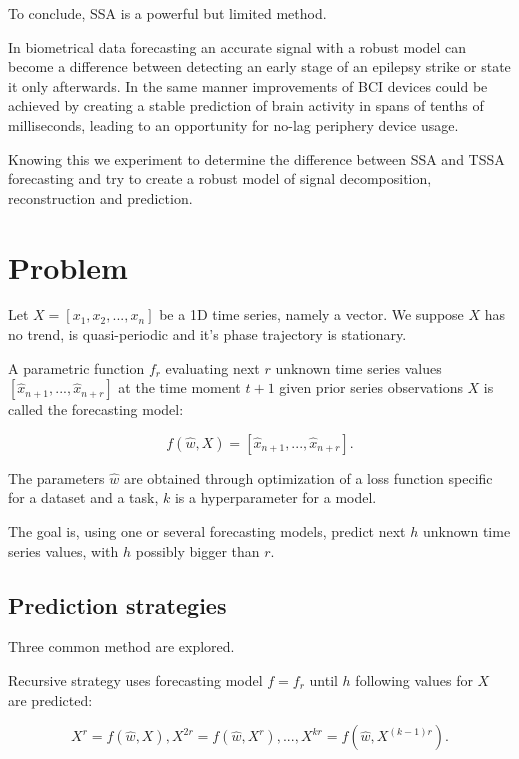 \documentclass{article}
\begin{document}
To conclude, SSA is a powerful but limited method.

In biometrical data forecasting an accurate signal with a robust model can become a difference between detecting an early stage of an epilepsy strike or state it only afterwards. In the same manner improvements of BCI devices could be achieved by creating a stable prediction of brain activity in spans of tenths of milliseconds, leading to an opportunity for no-lag periphery device usage. 

Knowing this we experiment to determine the difference between SSA and TSSA forecasting and try to create a robust model of signal decomposition, reconstruction and prediction.
\section{Problem}
\label{sec:Problem}

Let \(X = \left[x_1, x_2, ..., x_n\right]\) be a 1D time series, namely a vector. We suppose \(X\) has no trend, is quasi-periodic and it's phase trajectory is stationary.

A parametric function \(f_r\) evaluating next \(r\) unknown time series values \([\widehat{x}_{n+1}, ..., \widehat{x}_{n+r}]\) at the time moment \(t + 1\) given prior series observations \(X\) is called the forecasting model:

\begin{equation}
	f(\widehat{w}, X) = [\widehat{x}_{n+1}, ..., \widehat{x}_{n+r}].
\end{equation}

The parameters \(\widehat{w}\) are obtained through optimization of a loss function specific for a dataset and a task, \(k\) is a hyperparameter for a model.

The goal is, using one or several forecasting models, predict next \(h\) unknown time series values, with \(h\) possibly bigger than \(r\).

\subsection{Prediction strategies}

Three common method are explored.

Recursive strategy uses forecasting model \(f = f_r\) until \(h\) following values for \(X\) are predicted:

\begin{equation}
	X^{r} = f(\widehat{w}, X), 
	X^{2r} = f(\widehat{w}, X^{r}),
	...,
	X^{kr} = f(\widehat{w}, X^{(k-1)r}).
\end{equation}
\end{document}
